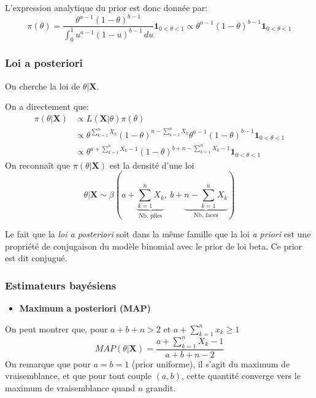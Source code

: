 \documentclass[]{article}
\providecommand{\tightlist}{%
  \setlength{\itemsep}{0pt}\setlength{\parskip}{0pt}}
\begin{document}
L'expression analytique du prior est donc donnée par:
\[\pi(\theta) = \frac {\theta^{a -1}(1-\theta)^{b -1}}{\int _{0}^{1}u^{a -1}(1-u)^{b -1}\,du}\mathbf{1}_{0 < \theta < 1} \propto \theta^{a -1}(1-\theta)^{b -1}\mathbf{1}_{0 < \theta < 1}\]

\hypertarget{loi-a-posteriori}{%
\subsubsection{Loi a posteriori}\label{loi-a-posteriori}}

On cherche la loi de \(\theta \vert \mathbf{X}\).

On a directement que: \begin{align*}
\pi(\theta \vert\mathbf{X}) &\propto L(\mathbf{X}\vert \theta)\pi(\theta)\\
&\propto \theta^{\sum_{k=1}^n X_k}\left(1 - \theta \right)^{n - \sum_{k=1}^n X_k} \theta^{a -1}(1-\theta)^{b -1}\mathbf{1}_{0 < \theta < 1}\\
&\propto \theta^{a + \sum_{k=1}^n X_k - 1}(1-\theta)^{b + n - \sum_{k=1}^n X_k -1}\mathbf{1}_{0 < \theta < 1}
\end{align*} On reconnaît que \(\pi(\theta\vert \mathbf{X})\) est la
densité d'une loi
\[\theta\vert \mathbf{X} \sim \beta\left(a + \underbrace{\sum_{k = 1}^n X_k}_{\text{Nb. piles}},~b + \underbrace{n - \sum_{k = 1}^n X_k}_{\text{Nb. faces}}\right)\]

Le fait que la \emph{loi a posteriori} soit dans la même famille que la
loi \emph{a priori} est une propriété de conjugaison du modèle binomial
avec le prior de loi beta. Ce prior est dit conjugué.

\hypertarget{estimateurs-bayuxe9siens-1}{%
\subsubsection{Estimateurs bayésiens}\label{estimateurs-bayuxe9siens-1}}

\begin{itemize}
\tightlist
\item
  \textbf{Maximum a posteriori (MAP)}
\end{itemize}

On peut montrer que, pour \(a + b + n > 2\) et
\(a + \sum_{k = 1}^n x_k \geq 1\)
\[MAP(\theta \vert \mathbf{X}) = \frac{a + \sum_{k = 1}^n X_k-1}{a  +  b + n -2}\]
On remarque que pour \(a = b = 1\) (prior uniforme), il s'agit du
maximum de vraisemblance, et que pour tout couple \((a, b)\), cette
quantité converge vers le maximum de vraisemblance quand \(n\) grandit.
\end{document}
